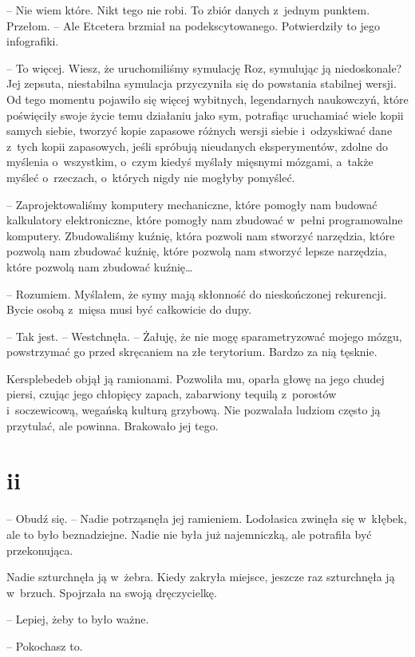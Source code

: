 \documentclass[oneside,polish,11pt,sfheadings]{mwbk}
\begin{document}
-- Nie wiem które. Nikt tego nie robi. To zbiór danych z~jednym punktem.
Przełom. -- Ale Etcetera brzmiał na podekscytowanego. Potwierdziły to
jego infografiki.

-- To więcej. Wiesz, że uruchomiliśmy symulację Roz, symulując ją
niedoskonale? Jej zepsuta, niestabilna symulacja przyczyniła się do
powstania stabilnej wersji. Od tego momentu pojawiło się więcej
wybitnych, legendarnych naukowczyń, które poświęciły swoje życie temu
działaniu jako sym, potrafiąc uruchamiać wiele kopii samych siebie,
tworzyć kopie zapasowe różnych wersji siebie i~odzyskiwać dane z~tych
kopii zapasowych, jeśli spróbują nieudanych eksperymentów, zdolne do
myślenia o~wszystkim, o~czym kiedyś myślały mięsnymi mózgami, a~także
myśleć o~rzeczach, o~których nigdy nie mogłyby pomyśleć.

-- Zaprojektowaliśmy komputery mechaniczne, które pomogły nam budować
kalkulatory elektroniczne, które pomogły nam zbudować w~pełni
programowalne komputery. Zbudowaliśmy kuźnię, która pozwoli nam stworzyć
narzędzia, które pozwolą nam zbudować kuźnię, które pozwolą nam stworzyć
lepsze narzędzia, które pozwolą nam zbudować kuźnię\ldots 

-- Rozumiem. Myślałem, że symy mają skłonność do nieskończonej
rekurencji. Bycie osobą z~mięsa musi być całkowicie do dupy.

-- Tak jest. -- Westchnęła. -- Żałuję, że nie mogę sparametryzować mojego
mózgu, powstrzymać go przed skręcaniem na złe terytorium. Bardzo za nią
tęsknie.

Kersplebedeb objął ją ramionami. Pozwoliła mu, oparła głowę na jego
chudej piersi, czując jego chłopięcy zapach, zabarwiony tequilą z~porostów i~soczewicową, wegańską kulturą grzybową. Nie pozwalała ludziom
często ją przytulać, ale powinna. Brakowało jej tego.

\chapter*{ii}

-- Obudź się. -- Nadie potrząsnęła jej ramieniem. Lodołasica zwinęła się w~kłębek, ale to było beznadziejne. Nadie nie była już najemniczką, ale
potrafiła być przekonująca.

Nadie szturchnęła ją w~żebra. Kiedy zakryła miejsce, jeszcze raz
szturchnęła ją w~brzuch. Spojrzała na swoją dręczycielkę. 

-- Lepiej, żeby
to było ważne.

-- Pokochasz to. 
\end{document}
